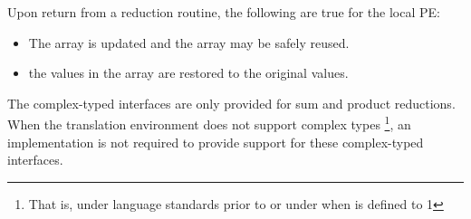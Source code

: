 \begin{apidefinition}
{    Upon return from a reduction routine, the following are true for the local
    \ac{PE}:
    \begin{itemize}
    \item The \dest{} array is updated and the \source{} array may be safely reused.
    \item {}
    the values in the  array are restored to the original values.
    \end{itemize}

    The complex-typed interfaces are only provided for sum and product reductions.
    When the \Cstd translation environment does not support complex types
    \footnote{That is, under \Cstd language standards prior to \Cstd[99] or under \Cstd[11]
    when  is defined to 1}, an \openshmem
    implementation is not required to provide support for these
    complex-typed interfaces.
}




\end{apidefinition}
